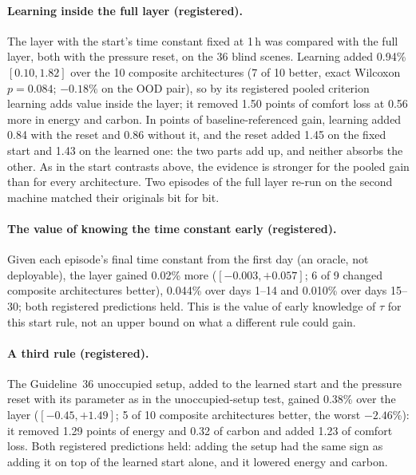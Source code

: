 \paragraph{Learning inside the full layer (registered).} The
layer with the start's time constant fixed at 1\,h was compared with the full layer, both with the pressure reset, on the 36
blind scenes. Learning added 0.94\% $[0.10, 1.82]$ over the 10 composite architectures (7 of 10 better, exact Wilcoxon
$p = 0.084$; $-0.18\%$ on the OOD pair), so by its registered pooled criterion learning adds value inside the layer; it removed
1.50 points of comfort loss at 0.56 more in energy and carbon. In points of baseline-referenced gain, learning added 0.84 with
the reset and 0.86 without it, and the reset added 1.45 on the fixed start and 1.43 on the learned one: the two parts add up,
and neither absorbs the other. As in the start contrasts above, the evidence is stronger for the pooled gain than for every
architecture. Two episodes of the full layer re-run on the second machine matched their originals bit for bit.

\paragraph{The value of knowing the time constant early (registered).} Given each episode's final time constant from the
first day (an oracle, not deployable), the layer gained 0.02\% more ($[-0.003, +0.057]$; 6 of 9 changed composite
architectures better), 0.044\% over days 1--14 and 0.010\% over days 15--30; both registered predictions held. This is the
value of early knowledge of $\tau$ for this start rule, not an upper bound on what a different rule could gain.

\paragraph{A third rule (registered).} The Guideline~36 unoccupied setup, added to the learned start and the pressure reset with its
parameter as in the unoccupied-setup test, gained 0.38\% over the layer ($[-0.45, +1.49]$; 5 of 10 composite
architectures better, the worst $-2.46$\%): it removed 1.29 points of energy and 0.32 of carbon and added 1.23 of comfort
loss. Both registered predictions held: adding the setup had the same sign as adding it on top of the learned start alone,
and it lowered energy and carbon.

